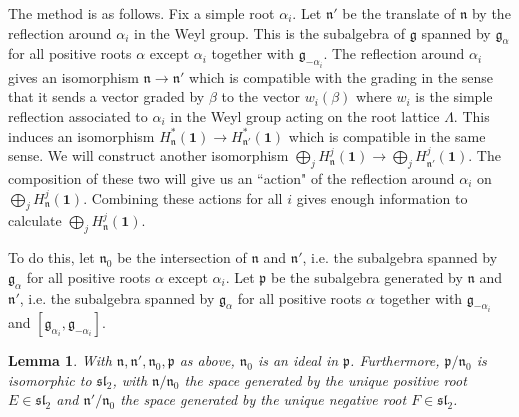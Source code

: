 \documentclass[11pt,letterpaper]{article}
\newtheorem{lemma}[theorem]{Lemma}
\theoremstyle{definition}
\theoremstyle{remark}
\numberwithin{equation}{section}
\theoremstyle{dotless}
\newcommand{\LieH}{H}
\begin{document}
The method is as follows. Fix a simple root $\alpha_i$. Let $\mathfrak n'$ be the translate of $\mathfrak n$ by the reflection around $\alpha_i$ in the Weyl group. This is the subalgebra of $\mathfrak g$ spanned by $\mathfrak g_{\alpha}$ for all positive roots $\alpha$ except $\alpha_i$ together with $\mathfrak g_{-\alpha_i}$. The reflection around $\alpha_i$ gives an isomorphism $\mathfrak n \to \mathfrak n'$ which is compatible with the grading in the sense that it sends a vector graded by $\beta$ to the vector $w_i(\beta)$ where $w_i$ is the simple reflection associated to $\alpha_i$ in the Weyl group acting on the root lattice $\Lambda$. This induces an isomorphism $\LieH^*_{\mathfrak n} ( \mathbf 1) \to \LieH^*_{\mathfrak n'} ( \mathbf 1)$ which is compatible in the same sense. We will construct another isomorphism $\bigoplus_j \LieH^j_{\mathfrak n} ( \mathbf 1) \to \bigoplus_j  \LieH^j_{\mathfrak n'} ( \mathbf 1)$. The composition of these two will give us an ``action" of the reflection around $\alpha_i$ on $\bigoplus_j \LieH^j_{\mathfrak n} ( \mathbf 1) $. Combining these actions for all $i$ gives enough information to calculate $\bigoplus_j \LieH^j_{\mathfrak n} ( \mathbf 1) $.

To do this, let $\mathfrak n_0$ be the intersection of $\mathfrak n$ and $\mathfrak n'$, i.e. the subalgebra spanned by $\mathfrak g_{\alpha}$ for all positive roots $\alpha$ except $\alpha_i$. Let $\mathfrak p$ be the subalgebra generated by $\mathfrak n$ and $\mathfrak n'$, i.e. the subalgebra spanned by $\mathfrak g_{\alpha}$ for all positive roots $\alpha$ together with $\mathfrak g_{-\alpha_i}$ and $[\mathfrak g_{\alpha_i}, \mathfrak g_{-\alpha_i}]$.

\begin{lemma}\label{lie-algebra-relations}  With $\mathfrak n, \mathfrak n', \mathfrak n_0, \mathfrak p$ as above, $\mathfrak n_0$ is an ideal in $\mathfrak p$. Furthermore, $\mathfrak p/\mathfrak n_0$ is isomorphic to $\mathfrak{sl}_2$, with $\mathfrak n/\mathfrak n_0$ the space generated by the unique positive root $E \in \mathfrak{sl}_2$ and $\mathfrak n'/\mathfrak n_0$ the space generated by the unique negative root $F\in \mathfrak{sl}_2$. \end{lemma}
\end{document}
